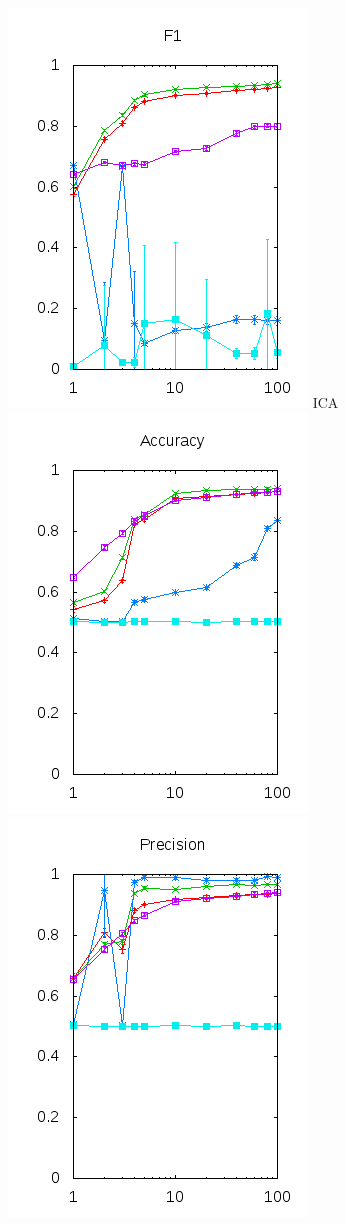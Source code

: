 \documentclass[10pt, a4paper]{article}
\begin{document}
\begin{figure}[H]
\begin{minipage}{1\textwidth}
	\includegraphics[scale=0.5]{../src/data/f1pca.png}
  \center ICA\\
	\includegraphics[scale=0.5]{../src/data/acica.png}
	\includegraphics[scale=0.5]{../src/data/prica.png}

\end{minipage}
\end{figure}
\end{document}
